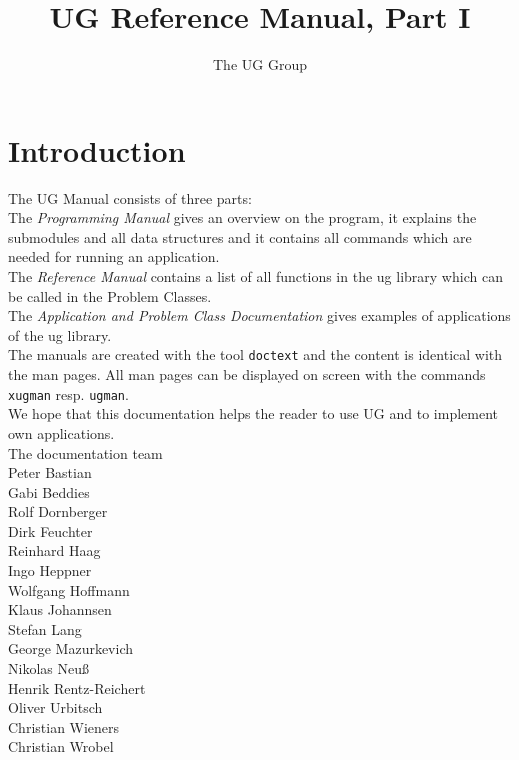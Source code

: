



\pagestyle{myheadings}
\sloppy
\makeindex




\newcommand{\sectitle}{\mbox{}}
\setcounter{page}{0}

\title{UG Reference Manual, Part I}
\author{The UG Group}
\maketitle



\section*{Introduction}

The UG Manual consists of three parts:
\\[5mm]  
The {\em Programming Manual} gives an overview on the program, it
explains the submodules and all data structures and it contains
all commands which are needed for running an application.
\\[5mm]  
The {\em Reference Manual} contains a list of all 
functions in the ug library which can be called in the Problem Classes.
\\[5mm]
The {\em Application and Problem Class Documentation} gives examples
of applications of the ug library.
\\[5mm]
The manuals are created with the tool {\tt doctext} and the content is 
identical with the man pages. All man pages can be displayed on screen 
with the commands {\tt xugman} resp. {\tt ugman}.
\\[5mm]
We hope that this documentation helps the reader to use UG 
and to implement own applications.
\\[1cm]
The documentation team
\\[1cm]
Peter Bastian\\
Gabi Beddies\\
Rolf Dornberger\\
Dirk Feuchter\\
Reinhard Haag\\
Ingo Heppner\\
Wolfgang Hoffmann\\
Klaus Johannsen\\
Stefan Lang\\
George Mazurkevich\\
Nikolas Neu\ss\\
Henrik Rentz-Reichert\\
Oliver Urbitsch\\
Christian Wieners\\
Christian Wrobel

